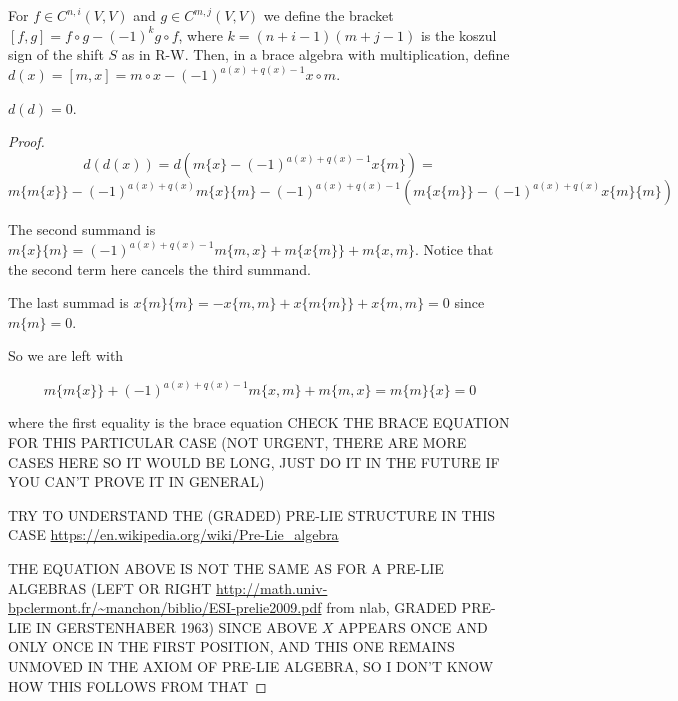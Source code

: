 \documentclass[twoside]{article}
\begin{document}
For $f\in C^{n,i}(V,V)$ and $g\in C^{m,j}(V,V)$ we define the bracket $[f,g]=f\circ g-(-1)^kg\circ f$, where $k=(n+i-1)(m+j-1)$ is the koszul sign of the shift $S$ as in R-W. Then, in a brace algebra with multiplication, define $d(x)=[m,x]=m\circ x-(-1)^{a(x)+q(x)-1}x\circ m$.

\begin{lemma}
$d(d)=0$. 
\end{lemma}
\begin{proof}

$$d(d(x))=d(m\{x\}-(-1)^{a(x)+q(x)-1}x\{m\})=$$ 
$$m\{m\{x\}\}-(-1)^{a(x)+q(x)}m\{x\}\{m\}-(-1)^{a(x)+q(x)-1}(m\{x\{m\}\}-(-1)^{a(x)+q(x)}x\{m\}\{m\})$$




The second summand is 
$m\{x\}\{m\}=(-1)^{a(x)+q(x)-1}m\{m,x\}+m\{x\{m\}\}+m\{x,m\}$. Notice that the second term here cancels the third summand. 


The last summad is
$x\{m\}\{m\}=-x\{m,m\}+x\{m\{m\}\}+x\{m,m\}=0$ since $m\{m\}=0$.

So we are left with

$$m\{m\{x\}\}+(-1)^{a(x)+q(x)-1}m\{x,m\}+m\{m,x\}=m\{m\}\{x\}=0$$

where the first equality is the brace equation CHECK THE BRACE EQUATION FOR THIS PARTICULAR CASE (NOT URGENT, THERE ARE MORE CASES HERE SO IT WOULD BE LONG, JUST DO IT IN THE FUTURE IF YOU CAN'T PROVE IT IN GENERAL)

TRY TO UNDERSTAND THE (GRADED) PRE-LIE STRUCTURE IN THIS CASE \url{https://en.wikipedia.org/wiki/Pre-Lie_algebra}

THE EQUATION ABOVE IS NOT THE SAME AS FOR A PRE-LIE ALGEBRAS (LEFT OR RIGHT \url{http://math.univ-bpclermont.fr/~manchon/biblio/ESI-prelie2009.pdf} from nlab, GRADED PRE-LIE IN GERSTENHABER 1963) SINCE ABOVE $X$ APPEARS ONCE AND ONLY ONCE IN THE FIRST POSITION, AND THIS ONE REMAINS UNMOVED IN THE AXIOM OF PRE-LIE ALGEBRA, SO I DON'T KNOW HOW THIS FOLLOWS FROM THAT


\end{proof}
\end{document}
